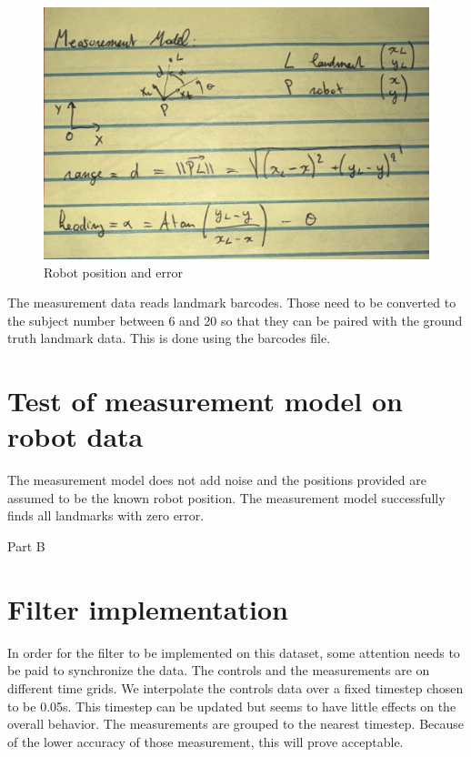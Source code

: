 \documentclass{article}
\begin{document}
\begin{figure}
\centering
\includegraphics[scale=0.3]{measurement_model.jpeg}
\caption{Robot position and error}
\label{fig:measmod}
\end{figure}

The measurement data reads landmark barcodes. Those need to be converted to the subject number between 6 and 20 so that they can be paired with the ground truth landmark data. This is done using the barcodes file.



\section{Test of measurement model on robot data}
The measurement model does not add noise and the positions provided are assumed to be the known robot position. The measurement model successfully finds all landmarks with zero error.

\vspace{1cm}
\large{Part B}
\normalsize{}

\section{Filter implementation}

In order for the filter to be implemented on this dataset, some attention needs to be paid to synchronize the data. The controls and the measurements are on different time grids. We interpolate the controls data over a fixed timestep chosen to be 0.05s. This timestep can be updated but seems to have little effects on the overall behavior. The measurements are grouped to the nearest timestep. Because of the lower accuracy of those measurement, this will prove acceptable.
\end{document}
